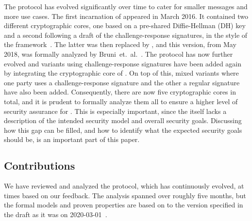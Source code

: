 \documentclass[runningheads,draft,x11names]{llncs}
\begin{document}
The \mEdhoc{} protocol has evolved significantly over time to cater for smaller
messages and more use cases.
%
The first incarnation of \mEdhoc{} appeared in March 2016.
%
It contained two different cryptographic cores, one based on a
pre-shared Diffie-Hellman (DH) key and a second following a draft of the
challenge-response signatures, in the style of the \mNoise{}
framework~\cite{perrin2016noise}.
%
The latter was then replaced by \mSigma, and this version, from May 2018, was
formally analyzed by Bruni~et.~al.~\cite{DBLP:conf/secsr/BruniJPS18}.
%
The protocol has now further evolved and variants using challenge-response
signatures have been added again by integrating the cryptographic core of
\mOptls{}.
%
On top of this, mixed variants where one party uses a challenge-response
signature and the other a regular signature have also been added.
%
Consequently, there are now five cryptographic cores in total, and it is prudent
to formally analyze them all to ensure a higher level of security assurance for
\mEdhoc.
%
This is especially important, since the \mSpec{} itself lacks a description
of the intended security model and overall security goals.
%
Discussing how this gap can be filled, and how to identify what the expected
security goals should be, is an important part of this paper.
%

\subsection{Contributions}
\label{sec:contributions}
We have reviewed and analyzed the \mEdhoc{} protocol, which has continuously
evolved, at times based on our feedback.
%
The analysis spanned over roughly five months, but the formal models and proven
properties are based on to the version specified in the draft as it was on
2020-03-01~\cite{selander-lake-edhoc-01}.
%
\end{document}
